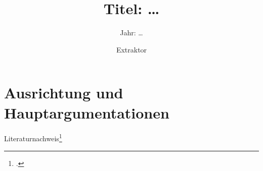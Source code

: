\documentclass[
  DIV=calc,
  BCOR=5mm,
  11pt,
  headings=small,
  oneside,
  abstract=true,
  toc=bib,
  english,ngerman]{scrartcl}
\begin{document}

\titlehead{Exzerpt (Deutsche Konfiguration)}
\subject{Autor(en): \ldots}
\title{Titel: \ldots}
\subtitle{Jahr: \ldots}
\author{Extraktor}

\maketitle



\section{Ausrichtung und Hauptargumentationen}

Literaturnachweis\footcite[vgl.][15]{KantKdV1974}

\small




\printnomenclature


\end{document}
